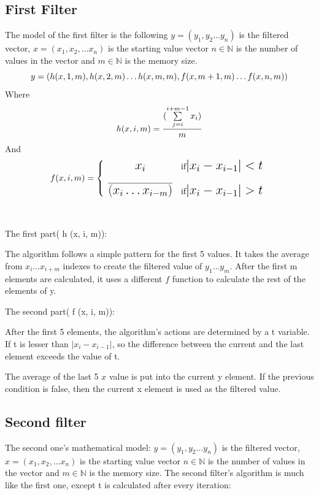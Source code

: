 \subsection{First Filter}
The model of the first filter is the following
$y=(y_1,y_2\ldots y_n)$ is the filtered vector, $x=(x_1,x_2,\ldots x_n)$ is the starting value vector $ n\in \mathbb{N} $ is the number of values in the vector and $m \in \mathbb{N}$ is the memory size.
\begin{equation}\fontsize{15pt}{2}
y=(h(x,1,m),h(x,2,m)\ldots h(x,m,m), f(x,m+1,m)\ldots f(x,n,m))
\end{equation}
Where
\begin{equation}\fontsize{15pt}{2}
h(x,i,m)={(\sum\limits_{j=i}^{i+m-1}x_i) \over m}
\end{equation}
And
\begin{equation}\fontsize{15pt}{2}
f(x,i,m)=
\left\{
	\begin{array}{ccc}
	x_i & \mbox{if} |x_i-x_{i-1}|<t \\
	\\
	\overline{(x_i\ldots x_{i-m})} & \mbox{if} |x_i-x_{i-1}|>t
	\end{array}
\right.
\end{equation}    
\\\\       
The first part( h (x, i, m)):


The algorithm follows a simple pattern for the first 5 values. It takes the average from $x_i\ldots x_{i+m}$ indexes to create the filtered value of $y_1\ldots y_m$.
After the first m elements are calculated, it uses a different $f$ function to calculate the rest of the elements of y. 


The second  part( f (x, i, m)):

After the first 5 elements, the algorithm's actions are determined by a t variable.
If t is lesser than $|x_i-x_{i-1}|$, so the difference between the current and the last element exceeds the value of t.

The average of the last 5 $x$ value is put into the current y element.
If the previous condition is false, then the current x element is used as the filtered value.

\subsection{Second filter}
The second one's mathematical model:
$y=(y_1,y_2\ldots y_n)$ is the filtered vector, $x=(x_1,x_2,\ldots x_n)$ is the starting value vector $ n\in \mathbb{N} $ is the number of values in the vector and $m \in \mathbb{N}$ is the memory size.
The second filter's algorithm is much like the first one, except t is calculated after every iteration: 



